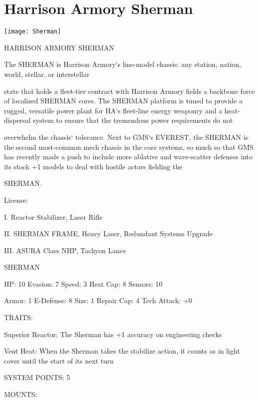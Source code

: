\section{Harrison Armory Sherman}

\texttt{[image: Sherman]}

                              HARRISON ARMORY SHERMAN

The SHERMAN is Harrison Armory‘s line-model chassis: any station, nation, world, stellar, or interstellar

state that holds a fleet-tier contract with Harrison Armory fields a backbone force of localized SHERMAN
cores. The SHERMAN platform is tuned to provide a rugged, versatile power plant for HA‘s fleet-line
energy weaponry and a heat-dispersal system to ensure that the tremendous power requirements do not

overwhelm the chassis‘ tolerance. Next to GMS‘s EVEREST, the SHERMAN is the second most-common
mech chassis in the core systems, so much so that GMS has recently made a push to include more
ablative and wave-scatter defenses into its stock +1 models to deal with hostile actors fielding the

SHERMAN.

                                                  License:

I. Reactor Stabilizer, Laser Rifle

II. SHERMAN FRAME, Heavy Laser, Redundant Systems Upgrade

III. ASURA Class NHP, Tachyon Lance


                                                SHERMAN

 HP: 10         Evasion: 7                            Speed: 3           Heat Cap: 8       Sensors: 10

 Armor: 1       E-Defense: 8                          Size: 1            Repair Cap: 4     Tech Attack:
                                                                                           +0

                                                  TRAITS:

 Superior Reactor: The Sherman has +1 accuracy on engineering checks

 Vent Heat: When the Sherman takes the stabilize action, it counts as in light cover until the start of its
 next turn

                                            SYSTEM POINTS: 5

                                                 MOUNTS:

